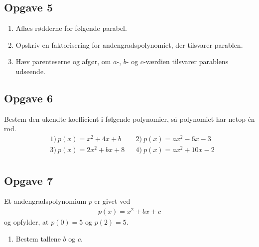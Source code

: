 \subsection*{Opgave 5}
\begin{enumerate}[label=\roman*)]
	\item Aflæs rødderne for følgende parabel.
	\item Opskriv en faktorisering for andengradspolynomiet, der tilsvarer parablen. 
	\item Hæv parenteserne og afgør, om $a$-, $b$- og $c$-værdien tilsvarer parablens udseende. 

\begin{center}
\end{center}


\end{enumerate}

\subsection*{Opgave 6}
Bestem den ukendte koefficient i følgende polynomier, så polynomiet har netop én rod. 
\begin{align*}
	&1) \ p(x) = x^2 + 4x + b &  &2) \ p(x) = ax^2 -6x - 3 \\
	&3) \ p(x) = 2x^2 + bx + 8 &  &4) \ p(x) = ax^2 +10x - 2   \\
\end{align*}


\subsection*{Opgave 7}
Et andengradspolynomium $p$ er givet ved
\begin{align*}
	p(x) = x^2 + bx +c 
\end{align*}
og opfylder, at $p(0) = 5$ og $p(2) = 5$.
\begin{enumerate}[label=\roman*)]
	\item Bestem tallene $b$ og $c$. 
\end{enumerate}

